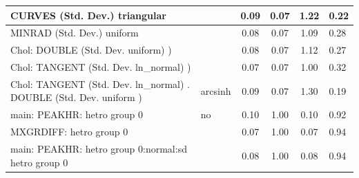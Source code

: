 \begin{table}
\begin{center}
\begin{tabular}{|l|l|c|c|c|l|}
			\hline
			CURVES (Std. Dev.) triangular &  & 0.09 & 0.07 & 1.22 & 0.22 \\
			\hline
			MINRAD (Std. Dev.) uniform &  & 0.08 & 0.07 & 1.09 & 0.28 \\
			\hline
			 Chol: DOUBLE (Std. Dev. uniform) ) &  & 0.08 & 0.07 & 1.12 & 0.27 \\
			\hline
			 Chol: TANGENT (Std. Dev. ln_normal) ) &  & 0.07 & 0.07 & 1.00 & 0.32 \\
			\hline
			 Chol: TANGENT (Std. Dev. ln_normal) . DOUBLE (Std. Dev.   uniform ) & arcsinh & 0.09 & 0.07 & 1.30 & 0.19 \\
			\hline
			main: PEAKHR: hetro group 0 & no & 0.10 & 1.00 & 0.10 & 0.92 \\
			\hline
			MXGRDIFF: hetro group 0 &  & 0.07 & 1.00 & 0.07 & 0.94 \\
			\hline
			main: PEAKHR: hetro group 0:normal:sd  hetro group 0 &  & 0.08 & 1.00 & 0.08 & 0.94 \\
			\hline
		\end{tabular}
	\end{center}
\end{table}